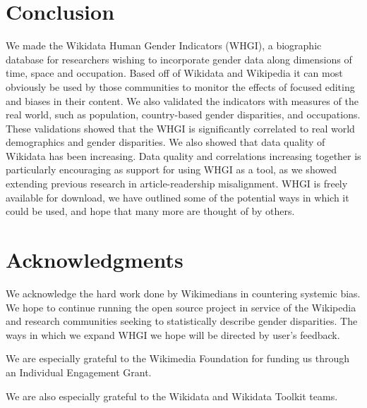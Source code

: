\documentclass{sig-alternate-05-2015}
\begin{document}
\section{Conclusion}
We made the Wikidata Human Gender Indicators (WHGI), a biographic database for researchers wishing to incorporate gender data along dimensions of time, space and occupation. Based off of Wikidata and Wikipedia it can most obviously be used by those communities to monitor the effects of focused editing and biases in their content. We also validated the indicators with measures of the real world, such as population, country-based gender disparities, and occupations. These validations showed that the WHGI is significantly correlated to real world demographics and gender disparities. We also showed that data quality of Wikidata has been increasing. Data quality and correlations increasing together is particularly encouraging as support for using WHGI as a tool, as we showed extending previous research in article-readership misalignment. WHGI is freely available for download, we have outlined some of the potential ways in which it could be used, and hope that many more are thought of by others.


\section{Acknowledgments}
We acknowledge the hard work done by Wikimedians in countering systemic bias. We hope to continue running the open source project in service of the Wikipedia and research communities seeking to statistically describe gender disparities. The ways in which we expand WHGI we hope will be directed by user's feedback.


We are especially grateful to the Wikimedia Foundation for funding us through an Individual Engagement Grant. 

We are also especially grateful to the Wikidata and Wikidata Toolkit teams.



%

\end{document}
